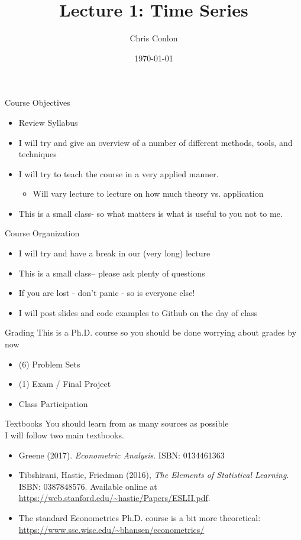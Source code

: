 \documentclass[aspectratio=169]{beamer}
\title{Lecture 1: Time Series}
\author{Chris Conlon }
\institute{NYU Stern }
\date{\today}
\begin{document}
\maketitle

\begin{frame}[fragile]{Course Objectives}
\begin{itemize}
\item Review Syllabus
\item I will try and give an overview of a number of different methods, tools, and techniques
\item I will try to teach the course in a very \alert{applied} manner.
\begin{itemize}
\item Will vary lecture to lecture on how much theory vs. application
\end{itemize} 
\item This is a small class- so what matters is what is useful to \alert{you} not to me.
\end{itemize} 
\end{frame}


\begin{frame}[fragile]{Course Organization}
\begin{itemize}
\item I will try and have a break in our (very long) lecture
\item This is a small class-- please ask plenty of questions
\item If you are lost - don't panic - so is everyone else!
\item I will post slides and code examples to Github on the day of class
\end{itemize} 
\end{frame}

\begin{frame}[fragile]{Grading}
This is a Ph.D. course so you should be done worrying about grades by now
\begin{itemize}
\item (6) Problem Sets
\item (1) Exam / Final Project
\item Class Participation
\end{itemize} 
\end{frame}


\begin{frame}[fragile]{Textbooks}
You should learn from as many sources as possible\\
I will follow two main textbooks.
\begin{itemize}
\item Greene (2017). \textit{Econometric Analysis}. ISBN: 0134461363
\item Tibshirani, Hastie, Friedman (2016), \textit{The Elements of Statistical Learning}. ISBN: 0387848576. Available online at \url{https://web.stanford.edu/~hastie/Papers/ESLII.pdf}.
\item The standard Econometrics Ph.D. course is a bit more theoretical: \url{https://www.ssc.wisc.edu/~bhansen/econometrics/}
\end{itemize} 
\end{frame}
\end{document}
